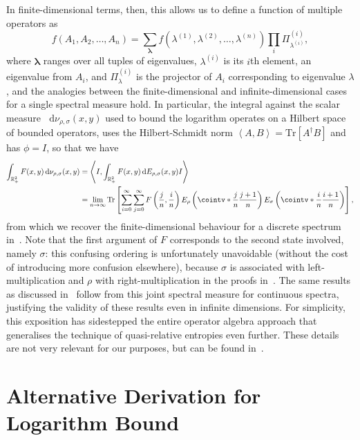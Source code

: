 \documentclass[10pt, a4paper]{article}
\numberwithin{equation}{section} %
\theoremstyle{definition}
\theoremstyle{plain}
\newcommand{\dif}{\mathop{}\!\mathrm{d}} %
\newcommand{\?}{\mathrel{?}} %
\newcommand{\R}{\mathbb{R}} %
\newcommand{\cvec}[1]{\boldsymbol{\mathbf{#1}}}    %
\newcommand{\angleb}[1]{\left\langle #1 \right\rangle} %
\newcommand{\Tr}{\mathrm{Tr}} %
\begin{document}
\begin{appendices}
      In finite-dimensional terms, then, this allows us to define a function of multiple operators as
      \[f(A_1, A_2, \ldots, A_n) = \sum_{\cvec{\lambda}} f(\lambda^{(1)}, \lambda^{(2)}, \ldots, \lambda^{(n)}) \prod_i \Pi^{(i)}_{\lambda^{(i)}}, \]
      where \(\cvec{\lambda}\) ranges over all tuples of eigenvalues, \(\lambda^{(i)}\) is its \(i\)th element, an eigenvalue from \(A_i\), and \(\Pi^{(i)}_{\lambda}\) is the projector of \(A_i\) corresponding to eigenvalue \(\lambda\), and the analogies between the finite-dimensional and infinite-dimensional cases for a single spectral measure hold. In particular, the integral against the scalar measure \(\dif{\nu_{\rho,\sigma}(x,y)}\) used to bound the logarithm operates on a Hilbert space of bounded operators, uses the Hilbert-Schmidt norm \(\angleb{A, B} = \Tr\left[A^{\dagger}B\right]\) and has \(\phi = I\), so that we have
      \begin{align*}
        \int_{\R_+^{2}} F(x,y) \dif{\nu_{\rho,\sigma}(x,y)} &= \angleb{I, \int_{\R_+^{2}} F(x,y) \dif{E_{\rho,\sigma}(x,y)} I} \\
                                                            &= \lim_{n\to\infty} \Tr\left[ \sum_{i=0}^{\infty}\sum_{j=0}^{\infty} F\left(\frac{j}{n}, \frac{i}{n}\right) E_{\rho}\left(\cointv*{\frac{j}{n}}{\frac{j+1}{n}}\right)
                                                            E_{\sigma}\left(\cointv*{\frac{i}{n}}{\frac{i+1}{n}}\right) \right],
      \end{align*}
      from which we recover the finite-dimensional behaviour for a discrete spectrum in~. Note that the first argument of \(F\) corresponds to the second state involved, namely \(\sigma\): this confusing ordering is unfortunately unavoidable (without the cost of introducing more confusion elsewhere), because \(\sigma\) is associated with left-multiplication and \(\rho\) with right-multiplication in the proofs in~\cite{BFF_QRE}. The same results as discussed in~ follow from this joint spectral measure for continuous spectra, justifying the validity of these results even in infinite dimensions. For simplicity, this exposition has sidestepped the entire operator algebra approach that generalises the technique of quasi-relative entropies even further. These details are not very relevant for our purposes, but can be found in~\cite{BFF_QRE}.

    \section{Alternative Derivation for Logarithm Bound}\label{sec:logratbound}


\end{appendices}
\end{document}
